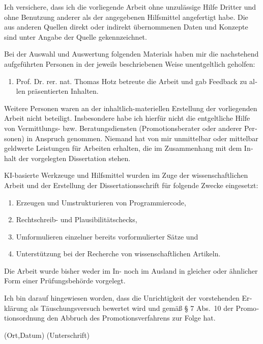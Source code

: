 \newpage
\thispagestyle{empty}
\mbox{}
\newpage
\thispagestyle{empty}
\begin{otherlanguage}{ngerman}
    
\vspace*{2cm}

\vspace{1cm}

Ich versichere, dass ich die vorliegende Arbeit ohne unzulässige Hilfe Dritter und ohne Benutzung anderer als der angegebenen Hilfsmittel angefertigt habe. Die aus anderen Quellen direkt oder indirekt übernommenen Daten und Konzepte sind unter Angabe der Quelle gekennzeichnet.

Bei der Auswahl und Auswertung folgenden Materials haben mir die nachstehend aufgeführten Personen in der jeweils beschriebenen Weise unentgeltlich geholfen:

\begin{enumerate}
    \item Prof. Dr. rer. nat. Thomas Hotz betreute die Arbeit und gab Feedback zu allen präsentierten Inhalten.
\end{enumerate}

\vspace{0.5cm}

Weitere Personen waren an der inhaltlich-materiellen Erstellung der vorliegenden Arbeit nicht beteiligt. Insbesondere habe ich hierfür nicht die entgeltliche Hilfe von Vermittlungs- bzw. Beratungsdiensten (Promotionsberater oder anderer Personen) in Anspruch genommen. Niemand hat von mir unmittelbar oder mittelbar geldwerte Leistungen für Arbeiten erhalten, die im Zusammenhang mit dem Inhalt der vorgelegten Dissertation stehen.

KI-basierte Werkzeuge und Hilfsmittel wurden im Zuge der wissenschaftlichen Arbeit und der Erstellung der Dissertationsschrift für folgende Zwecke eingesetzt:

\begin{enumerate}
    \item Erzeugen und Umstrukturieren von Programmiercode,
    \item Rechtschreib- und Plausibilitätschecks,
    \item Umformulieren einzelner bereits vorformulierter Sätze und
    \item Unterstützung bei der Recherche von wissenschaftlichen Artikeln.
\end{enumerate}

Die Arbeit wurde bisher weder im In- noch im Ausland in gleicher oder ähnlicher Form einer Prüfungsbehörde vorgelegt.

Ich bin darauf hingewiesen worden, dass die Unrichtigkeit der vorstehenden Erklärung als Täuschungsversuch bewertet wird und gemäß § 7 Abs.\ 10 der Promotionsordnung den Abbruch des Promotionsverfahrens zur Folge hat.

\vspace{3cm}

\noindent\makebox[0.3\textwidth]{\hrulefill} \hfill \makebox[0.3\textwidth]{\hrulefill}

\noindent(Ort,Datum) \hfill (Unterschrift)
\end{otherlanguage}